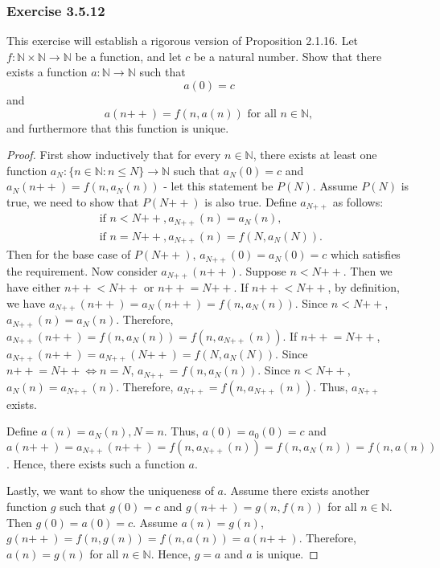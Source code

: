 \documentclass[12pt, letter]{article}
\begin{document}
\subsubsection*{Exercise 3.5.12}
This exercise will establish a rigorous version of Proposition 2.1.16. Let $f:\mathbb{N}\times \mathbb{N}\to \mathbb{N}$ be a function, and let $c$ be a natural number. Show that there exists a function $a:\mathbb{N}\to \mathbb{N}$ such that 
\begin{equation*}
    a(0)=c
\end{equation*}
and 
\begin{equation*}
    a(n\mathtt{++})=f(n,a(n))\text{ for all }n\in \mathbb{N},
\end{equation*}
and furthermore that this function is unique.
\begin{proof}
    First show inductively that for every $n\in\mathbb{N}$, there exists at least one function $a_N:\{n\in\mathbb{N}:n\leq N\}\to \mathbb{N}$ such that $a_N(0)=c$ and $a_N(n\mathtt{++})=f(n,a_N(n))$ - let this statement be $P(N)$. Assume $P(N)$ is true, we need to show that 
    $P(N\mathtt{++})$ is also true. Define $a_{N\mathtt{++}}$ as follows: 
    \begin{equation*}
        \begin{gathered}
            \text{ if }n < N\mathtt{++}, a_{N\mathtt{++}}(n)=a_N(n),\\
            \text{ if }n = N\mathtt{++}, a_{N\mathtt{++}}(n)=f(N,a_N(N)).
        \end{gathered}
    \end{equation*}
    Then for the base case of $P(N\mathtt{++})$, $a_{N\mathtt{++}}(0)=a_N(0)=c$ which satisfies the requirement. Now consider $a_{N\mathtt{++}}(n\mathtt{++})$. Suppose $n<N\mathtt{++}$. Then we have either $n\mathtt{++}<N\mathtt{++}$ or $n\mathtt{++}=N\mathtt{++}$. If $n\mathtt{++}<N\mathtt{++}$, by definition, we have $a_{N\mathtt{++}}(n\mathtt{++})=a_N(n\mathtt{++})=f(n,a_N(n))$. Since $n<N\mathtt{++}$,
    $a_{N\mathtt{++}}(n)=a_N(n)$. Therefore, $a_{N\mathtt{++}}(n\mathtt{++})=f(n,a_N(n))=f(n,a_{N\mathtt{++}}(n))$. If $n\mathtt{++}=N\mathtt{++}$, $a_{N\mathtt{++}}(n\mathtt{++})=a_{N\mathtt{++}}(N\mathtt{++})=f(N,a_N(N))$. Since $n\mathtt{++}=N\mathtt{++}\iff n=N$, $a_{N\mathtt{++}}=f(n,a_N(n))$. Since $n<N\mathtt{++}$, $a_N(n)=a_{N\mathtt{++}}(n)$. Therefore, $a_{N\mathtt{++}}=f(n,a_{N\mathtt{++}}(n))$. 
    Thus, $a_{N\mathtt{++}}$ exists. 
    
    Define $a(n)=a_N(n), N=n$. Thus, $a(0)=a_0(0)=c$ and $a(n\mathtt{++})=a_{N\mathtt{++}}(n\mathtt{++})=f(n,a_{N\mathtt{++}}(n))=f(n,a_N(n))=f(n,a(n))$. Hence, there exists such a function $a$.

    Lastly, we want to show the uniqueness of $a$. Assume there exists another function $g$ such that $g(0)=c$ and $g(n\mathtt{++})=g(n,f(n))$ for all $n\in \mathbb{N}$. Then $g(0)=a(0)=c$. Assume $a(n)=g(n)$, $g(n\mathtt{++})=f(n,g(n))=f(n,a(n))=a(n\mathtt{++})$. Therefore, $a(n)=g(n)$ for all $n\in \mathbb{N}$. 
    Hence, $g=a$ and $a$ is unique.
\end{proof}
\end{document}
